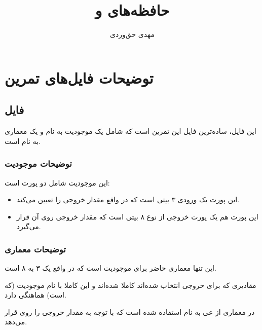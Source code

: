 \documentclass[dvipsnames, svgnames, x11names, a4paper, 11pt]{article}
\title{حافظه‌های \lr{ROM} و \lr{BRAM}}
\author{مهدی حق‌وردی}
\begin{document}
\maketitle
\tableofcontents

\section{توضیحات فایل‌های تمرین}
\subsection{فایل }
این فایل، ساده‌ترین فایل این تمرین است که شامل یک موجودیت به نام
و یک معماری به نام 
است.

\subsubsection{توضیحات موجودیت }
این موجودیت شامل دو پورت است:
\begin{itemize}
\item 
{}

این پورت یک ورودی 
۳ بیتی است که در واقع مقدار خروجی را تعیین می‌کند.

\item 
{}

این پورت هم یک پورت خروجی از نوع 
۸ بیتی است که مقدار خروجی روی آن قرار می‌گیرد.
\end{itemize}

\subsubsection{توضیحات معماری }
این تنها معماری حاضر برای موجودیت 
است که در واقع یک  ۳ به ۸ است.

مقادیری که برای خروجی انتخاب شده‌اند کاملا  شده‌اند و این کاملا با نام موجودیت (که  است) هماهنگی دارد.

در معماری از 
عی به نام 
استفاده شده است که با توجه به مقدار 
خروجی را روی 
قرار می‌دهد.
\end{document}
